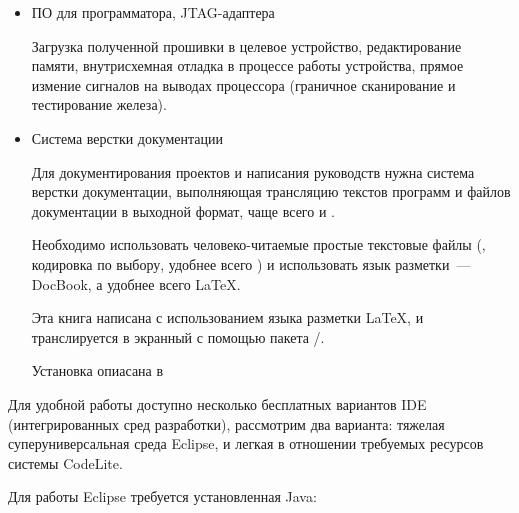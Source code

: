 \begin{itemize}
  \item ПО для программатора, JTAG-адаптера
  
  Загрузка полученной прошивки в целевое устройство, редактирование памяти, 
  внутрисхемная отладка в процессе работы устройства, прямое измение сигналов на
  выводах процессора (граничное сканирование и тестирование железа).
  
  \item Система верстки документации
  
  Для документирования проектов и написания руководств нужна система верстки
  документации, выполняющая трансляцию текстов программ и файлов 
  документации в выходной формат, чаще всего  и .
  
  Необходимо использовать человеко-читаемые простые текстовые файлы 
  (, кодировка по выбору, удобнее всего ) и
  использовать язык разметки\ --- DocBook, а удобнее всего \LaTeX.
  
  
  Эта книга написана с использованием языка разметки \LaTeX, и транслируется
  в экранный  с помощью пакета /.
  
  Установка опиасана в 
  
\end{itemize}


Для удобной работы доступно несколько бесплатных вариантов IDE (интегрированных сред разработки),
рассмотрим два варианта: тяжелая суперуниверсальная среда Eclipse, и легкая в отношении требуемых
ресурсов системы CodeLite.

\bigskip Для работы Eclipse требуется установленная Java:

\bigskip{}

